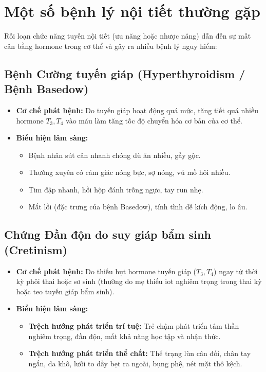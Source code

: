 \section{Một số bệnh lý nội tiết thường gặp}

Rối loạn chức năng tuyến nội tiết (ưu năng hoặc nhược năng) dẫn đến sự mất cân bằng hormone trong cơ thể và gây ra nhiều bệnh lý nguy hiểm:

\subsection{Bệnh Cường tuyến giáp (Hyperthyroidism / Bệnh Basedow)}
\begin{itemize}
    \item \textbf{Cơ chế phát bệnh:} Do tuyến giáp hoạt động quá mức, tăng tiết quá nhiều hormone $T_3, T_4$ vào máu làm tăng tốc độ chuyển hóa cơ bản của cơ thể.
    \item \textbf{Biểu hiện lâm sàng:}
    \begin{itemize}
        \item Bệnh nhân sút cân nhanh chóng dù ăn nhiều, gầy gộc.
        \item Thường xuyên có cảm giác nóng bực, sợ nóng, vú mồ hôi nhiều.
        \item Tim đập nhanh, hồi hộp đánh trống ngực, tay run nhẹ.
        \item Mắt lồi (đặc trưng của bệnh Basedow), tính tình dễ kích động, lo âu.
    \end{itemize}
\end{itemize}

\subsection{Chứng Đần độn do suy giáp bẩm sinh (Cretinism)}
\begin{itemize}
    \item \textbf{Cơ chế phát bệnh:} Do thiếu hụt hormone tuyến giáp ($T_3, T_4$) ngay từ thời kỳ phôi thai hoặc sơ sinh (thường do mẹ thiếu iot nghiêm trọng trong thai kỳ hoặc teo tuyến giáp bẩm sinh).
    \item \textbf{Biểu hiện lâm sàng:}
    \begin{itemize}
        \item \textbf{Trệch hướng phát triển trí tuệ:} Trẻ chậm phát triển tâm thần nghiêm trọng, đần độn, mất khả năng học tập và nhận thức.
        \item \textbf{Trệch hướng phát triển thể chất:} Thể trạng lùn cân đối, chân tay ngắn, da khô, lưỡi to dầy bẹt ra ngoài, bụng phệ, nét mặt thô kệch.
    \end{itemize}
\end{itemize}

